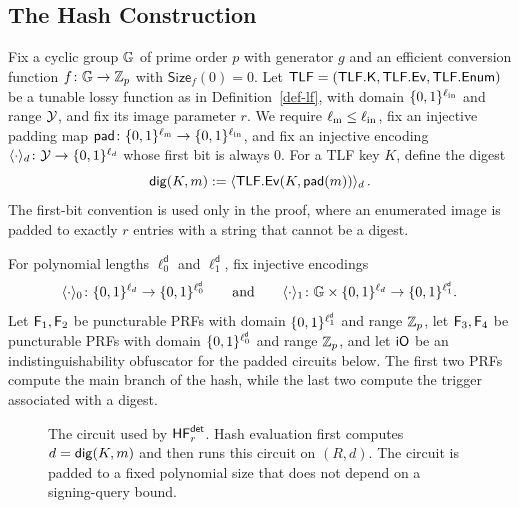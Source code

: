 \subsection{The Hash Construction} \label{sec-derand-constr}

Fix a cyclic group $\mathbb{G}$ of prime order $p$ with generator $g$ and an efficient conversion function $f\colon\mathbb{G}\to\mathbb Z_p$ with $\mathsf{Size}_f(0)=0$. Let $\mathsf{TLF}=(\mathsf{TLF}.\mathsf{K},\mathsf{TLF}.\mathsf{Ev},\mathsf{TLF}.\mathsf{Enum})$ be a tunable lossy function as in Definition~\ref{def-lf}, with domain $\{0,1\}^{\ell_{\mathrm{in}}}$ and range $\mathcal{Y}$, and fix its image parameter $r$. We require $\ell_{\mathrm{m}}\le\ell_{\mathrm{in}}$, fix an injective padding map $\mathsf{pad}\colon\{0,1\}^{\ell_{\mathrm{m}}}\to\{0,1\}^{\ell_{\mathrm{in}}}$, and fix an injective encoding $\langle \cdot \rangle_d\colon\mathcal{Y}\to\{0,1\}^{\ell_d}$ whose first bit is always 0. For a TLF key $K$, define the digest
$$
\mathsf{dig}(K,m):=\langle \mathsf{TLF}.\mathsf{Ev}(K,\mathsf{pad}(m)) \rangle_d \, .
$$
The first-bit convention is used only in the proof, where an enumerated image is padded to exactly $r$ entries with a string that cannot be a digest.

For polynomial lengths $\ell^{\mathsf d}_0$ and $\ell^{\mathsf d}_1$, fix injective encodings
$$
\langle \cdot \rangle_0\colon\{0,1\}^{\ell_d}\to\{0,1\}^{\ell^{\mathsf d}_0}
\qquad\text{and}\qquad
\langle \cdot \rangle_1\colon\mathbb{G}\times\{0,1\}^{\ell_d}\to\{0,1\}^{\ell^{\mathsf d}_1}.
$$
Let $\mathsf{F}_1,\mathsf{F}_2$ be puncturable PRFs with domain $\{0,1\}^{\ell^{\mathsf d}_1}$ and range $\mathbb Z_p$, let $\mathsf{F}_3,\mathsf{F}_4$ be puncturable PRFs with domain $\{0,1\}^{\ell^{\mathsf d}_0}$ and range $\mathbb Z_p$, and let $\mathsf{iO}$ be an indistinguishability obfuscator for the padded circuits below. The first two PRFs compute the main branch of the hash, while the last two compute the trigger associated with a digest.

\begin{figure}[t]
\begin{center}
\end{center}
\vspace{-6pt}
\caption{The circuit used by $\mathsf{HF}^{\mathsf{det}}_r$. Hash evaluation first computes $d=\mathsf{dig}(K,m)$ and then runs this circuit on $(R,d)$. The circuit is padded to a fixed polynomial size that does not depend on a signing-query bound.}\label{fig-circuit-deterministic}
\vspace{-3pt}\hrulefill
\vspace{-1ex}
\end{figure}

